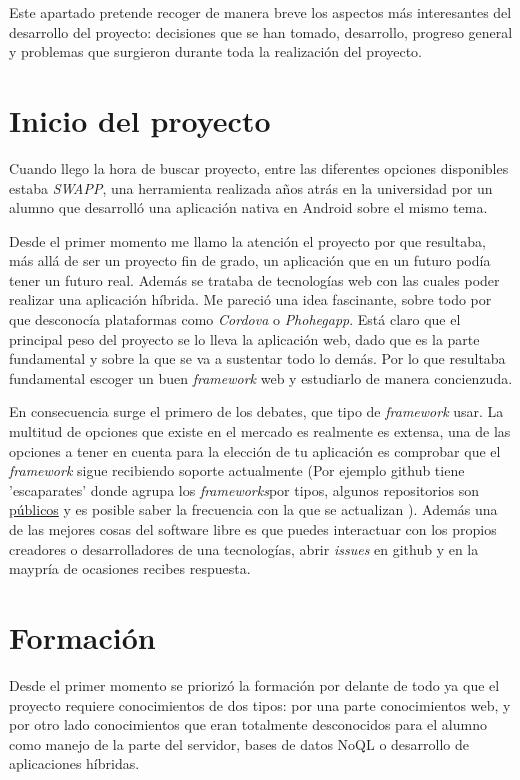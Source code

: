 
Este apartado pretende recoger de manera breve los aspectos más interesantes del desarrollo del proyecto: decisiones que se han tomado, desarrollo, progreso general y problemas que surgieron durante toda la realización del proyecto.


\section{Inicio del proyecto}\label{inicio-proyecto}
Cuando llego la hora de buscar proyecto, entre las  diferentes opciones disponibles estaba \emph{SWAPP}, una herramienta realizada años atrás en la universidad por un alumno que desarrolló una aplicación nativa en Android sobre el mismo tema.

 Desde el primer momento me llamo la atención el proyecto por que resultaba, más allá de ser un proyecto fin de grado, un aplicación que en un futuro podía tener un futuro real. Además se trataba de tecnologías web con las cuales poder realizar una aplicación híbrida. Me pareció una idea fascinante, sobre todo por que desconocía plataformas como \emph{Cordova} o \emph{Phohegapp}. Está claro que el principal peso del proyecto se lo lleva la aplicación web, dado que es la parte fundamental y sobre la que se va a sustentar todo lo demás. Por lo que resultaba fundamental escoger un buen \emph{framework} web y estudiarlo de manera concienzuda.
 
  En consecuencia surge el primero de los debates, que tipo de \emph{framework} usar. La multitud de opciones que existe en el mercado es realmente es extensa, una de las opciones a tener en cuenta para la elección de tu aplicación es comprobar que el \emph{framework} sigue recibiendo soporte actualmente (Por ejemplo github tiene 'escaparates' donde agrupa los \emph{frameworks}por tipos, algunos repositorios son \hyperlink{ https://github.com/showcases/web-application-frameworks/}{públicos}  y es posible saber la frecuencia con la que se actualizan ). Además una de las mejores cosas del software libre es que puedes interactuar con los propios creadores  o desarrolladores de una tecnologías, abrir \emph{issues} en github y en la maypría de  ocasiones recibes respuesta. 
  
  
  \section{Formación}\label{formacion}
Desde el primer momento se priorizó la formación por delante de todo ya que el proyecto requiere conocimientos de dos tipos: por una parte conocimientos web, y por otro lado conocimientos que eran totalmente desconocidos para el alumno como manejo de la parte del servidor, bases de datos NoQL o desarrollo de aplicaciones híbridas. 

